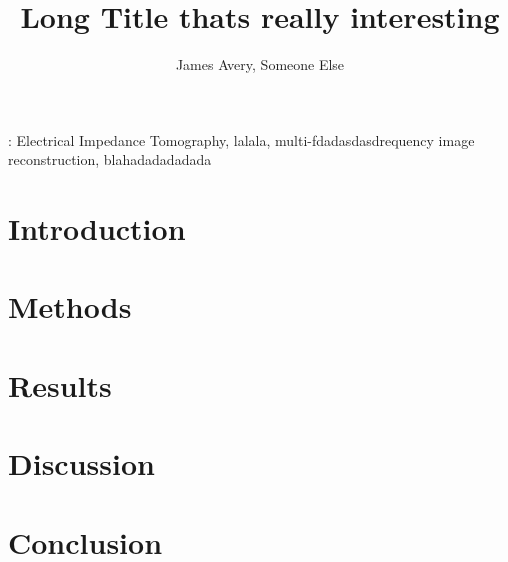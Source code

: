 \documentclass[12pt]{iopart}
\begin{document}
\title[Example Short Title]{Long Title thats really interesting}
\author{James Avery, Someone Else}

\address{University College London, London WC1E 6BT, UK }
\begin{abstract}

\end{abstract}

\vspace{2pc}
: Electrical Impedance Tomography, lalala, multi-fdadasdasdrequency image reconstruction, blahadadadadada

\submitto{\PM}
\maketitle

\section{Introduction}

\section{Methods}

\section{Results}

\section{Discussion}

\section{Conclusion}




\end{document}
